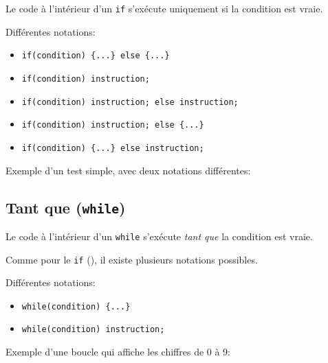 				Le code à l'intérieur d'un \lstinline|if| s'exécute uniquement si la condition est vraie.
				
			
				Différentes notations:
				\begin{itemize}
					\item \lstinline|if(condition) {...} else {...}|
					\item \lstinline|if(condition) instruction;|
					\item \lstinline|if(condition) instruction; else instruction;|
					\item \lstinline|if(condition) instruction; else {...}|
					\item \lstinline|if(condition) {...} else instruction;|
				\end{itemize}
			
				\begin{exemple}
					Exemple d'un test simple, avec deux notations différentes:
					
				\end{exemple}
			
			\subsection{Tant que (\lstinline|while|)}
			
				Le code à l'intérieur d'un \lstinline|while| s'exécute \emph{tant que} la condition est vraie.
			
				\begin{remarque}
					Comme pour le \lstinline|if| (), il existe plusieurs notations possibles.
				\end{remarque}
			
				Différentes notations:
				\begin{itemize}
					\item \lstinline|while(condition) {...}|
					\item \lstinline|while(condition) instruction;|
				\end{itemize}
			
				\begin{exemple}
					Exemple d'une boucle qui affiche les chiffres de \num{0} à \num{9}:
					
				\end{exemple}
			
